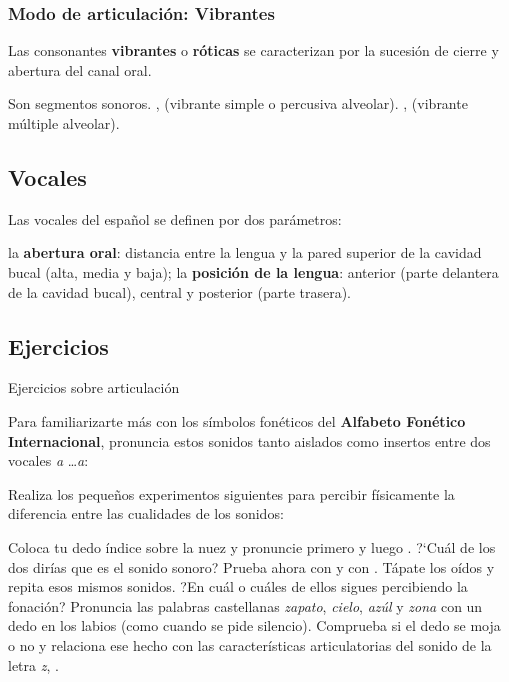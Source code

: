 \documentclass[12pt]{article}
\begin{document}
\subsubsection{Modo de articulación: Vibrantes}

Las consonantes \textbf{vibrantes} o \textbf{róticas} se caracterizan por la sucesión de cierre y abertura del canal oral.

\pex Son segmentos sonoros.
\a \textipa{[R]}, (vibrante simple o percusiva alveolar).
\a	\textipa{[r]}, (vibrante múltiple alveolar).
\xe



\subsection{Vocales}

	
	Las vocales del español se definen por dos parámetros:
	
	\pex
\a  la \textbf{abertura oral}: distancia entre la lengua y la pared superior de la cavidad bucal (alta, media y baja);
\a la \textbf{posición de la lengua}: anterior (parte delantera de la cavidad bucal), central y posterior (parte trasera).
\xe




		\begin{center}
		\end{center}



\subsection{Ejercicios}

Ejercicios sobre articulación

	Para familiarizarte más con los símbolos fonéticos del \textbf{Alfabeto Fonético
Internacional}, pronuncia estos sonidos tanto aislados como insertos entre dos vocales 
	\textit{a} \ldots \textit{a}:
	
	
	\ex	{}
\xe
	



	Realiza los pequeños experimentos siguientes para percibir físicamente la diferencia entre las cualidades de los sonidos:
	
\pex
\a	Coloca tu dedo índice sobre la nuez y pronuncie primero \textipa{[p]} y
luego \textipa{[b]}. ?`Cuál de los dos dirías
 que es el sonido sonoro? Prueba ahora con \textipa{[s]} y con \textipa{[i]}.
\a	Tápate los oídos y repita esos mismos sonidos. ?En cuál o cuáles
de ellos sigues percibiendo la fonación?
\a	Pronuncia las palabras castellanas \textit{zapato}, \textit{cielo}, \textit{azúl} y \textit{zona} con un
dedo en los labios (como cuando se pide silencio). Comprueba si
el dedo se moja o no y relaciona ese hecho con las características
articulatorias del sonido de la letra \textit{z},  .
\xe
\end{document}
